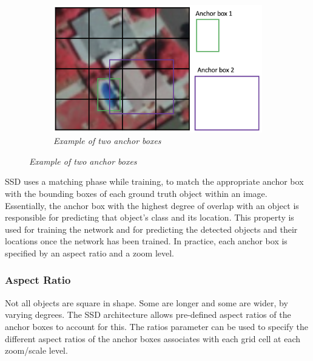 \begin{figure}[H]
    \centering
    \begin{subfigure}[b]{0.5\textwidth}
        \centering
        \includegraphics[width=\textwidth]{Figures/2. Related Work/ssd_3.png}
        \caption{\textit{
                Example of two anchor boxes
            } \cite{ssd_1}}
    \end{subfigure}
\end{figure}

SSD uses a matching phase while training, to match the appropriate anchor box
with the bounding boxes of each ground truth object within an image.
Essentially, the anchor box with the highest degree of overlap with an object is
responsible for predicting that object's class and its location. This property
is used for training the network and for predicting the detected objects and
their locations once the network has been trained. In practice, each anchor box
is specified by an aspect ratio and a zoom level.

\subsubsection{Aspect Ratio}
Not all objects are square in shape. Some are longer and some are wider,
by varying degrees. The SSD architecture allows pre-defined aspect ratios of
the anchor boxes to account for this. The ratios parameter can be used to
specify the different aspect ratios of the anchor boxes associates with each
grid cell at each zoom/scale level.

